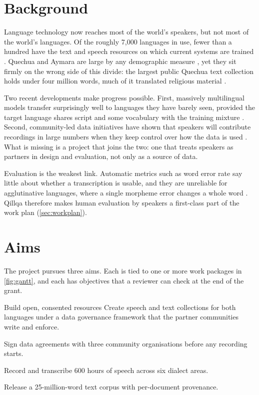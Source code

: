 \documentclass[11pt]{article}
\newcommand{\ShortTitle}{Qillqa}
\begin{document}
\section{Background}\label{sec:background}

Language technology now reaches most of the world's speakers, but not most
of the world's languages. Of the roughly 7,000 languages in use, fewer than a
hundred have the text and speech resources on which current systems are
trained \parencite{ortega2024resource}. Quechua and Aymara are large by any
demographic measure \parencite{adelaar2004languages}, yet they sit firmly on the wrong side of this divide:
the largest public Quechua text collection holds under four million words,
much of it translated religious material \parencite{huaman2023corpus}.

Two recent developments make progress possible. First, massively multilingual
models transfer surprisingly well to languages they have barely seen, provided
the target language shares script and some vocabulary with the training
mixture \parencite{lindqvist2025transfer}. Second, community-led data
initiatives have shown that speakers will contribute recordings in large
numbers when they keep control over how the data is used
\parencite{tupa2022governance,carroll2020care}. What is missing is a project
that joins the two: one that treats speakers as partners in design and
evaluation, not only as a source of data.

Evaluation is the weakest link. Automatic metrics such as word error rate say
little about whether a transcription is usable, and they are unreliable for
agglutinative languages, where a single morpheme error changes a whole word
\parencite{mendoza2024metrics}. \ShortTitle{} therefore makes human evaluation
by speakers a first-class part of the work plan (\cref{sec:workplan}).

\section{Aims}\label{sec:aims}

The project pursues three aims. Each is tied to one or more work packages in
\cref{fig:gantt}, and each has objectives that a reviewer can check at the end
of the grant.

\begin{aim}{Build open, consented resources}\label{aim:data}
  Create speech and text collections for both languages under a data
  governance framework that the partner communities write and enforce.
  \begin{objectives}
    \item Sign data agreements with three community organisations before any
          recording starts.\label{obj:agreements}
    \item Record and transcribe 600 hours of speech across six dialect areas.
    \item Release a 25-million-word text corpus with per-document provenance.
  \end{objectives}
\end{aim}
\end{document}
